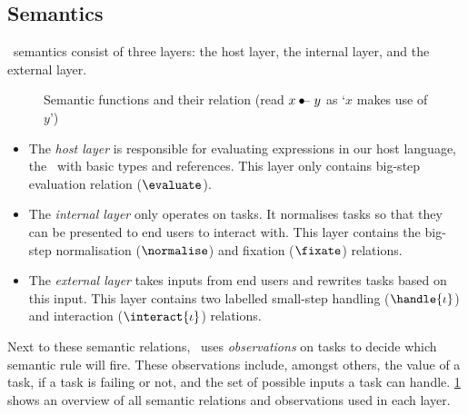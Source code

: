 \subsection{Semantics}

\TOPHAT\ semantics consist of three layers: the host layer, the internal layer, and the external layer.

\begin{figure}[h]
  \caption{Semantic functions and their relation
    (read $x \bullet\!\!\raisebox{-0.1ex}{\mbox{–}}\ y$ as `$x$ makes use of $y$')}
  \label{fig:semantic-layers}
\end{figure}

\begin{itemize}
  \item
    The \emph{host layer} is responsible for evaluating expressions in our host language,
    the \STLC\ with basic types and references.
    This layer only contains big-step evaluation relation ($\evaluate$).
  \item
    The \emph{internal layer} only operates on tasks.
    It normalises tasks so that they can be presented to end users to interact with.
    This layer contains the big-step normalisation ($\normalise$) and fixation ($\fixate$) relations.
  \item
    The \emph{external layer} takes inputs from end users and rewrites tasks based on this input.
    This layer contains two labelled small-step handling ($\handle{\iota}$) and interaction ($\interact{\iota}$) relations.
\end{itemize}

Next to these semantic relations, \TOPHAT\ uses \emph{observations} on tasks to decide which semantic rule will fire.
These observations include, amongst others,
the value of a task,
if a task is failing or not,
and the set of possible inputs a task can handle.
\cref{fig:semantic-layers} shows an overview of all semantic relations and observations used in each layer.
